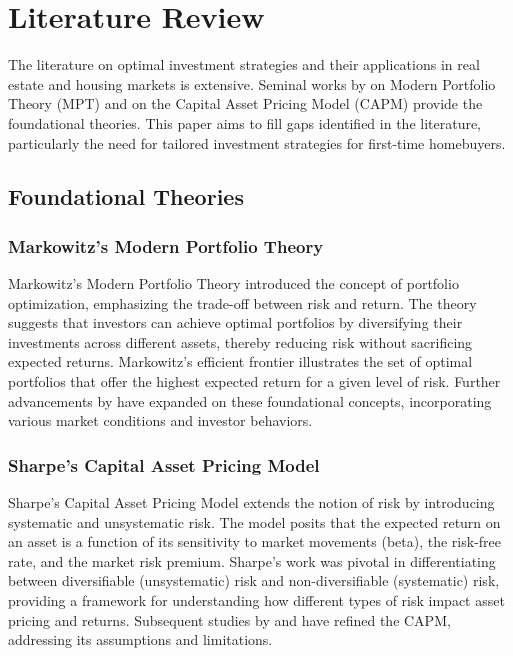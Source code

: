 \section{Literature Review}

The literature on optimal investment strategies and their applications in real estate and housing markets is extensive. Seminal works by \citet{markowitz1952portfolio} on Modern Portfolio Theory (MPT) and \citet{sharpe1964capital} on the Capital Asset Pricing Model (CAPM) provide the foundational theories. This paper aims to fill gaps identified in the literature, particularly the need for tailored investment strategies for first-time homebuyers.

\subsection{Foundational Theories}

\subsubsection{Markowitz's Modern Portfolio Theory}
Markowitz's Modern Portfolio Theory \citep{markowitz1952portfolio} introduced the concept of portfolio optimization, emphasizing the trade-off between risk and return. The theory suggests that investors can achieve optimal portfolios by diversifying their investments across different assets, thereby reducing risk without sacrificing expected returns. Markowitz's efficient frontier illustrates the set of optimal portfolios that offer the highest expected return for a given level of risk. Further advancements by \citet{fabozzi2002foundations} have expanded on these foundational concepts, incorporating various market conditions and investor behaviors.

\subsubsection{Sharpe's Capital Asset Pricing Model}
Sharpe's Capital Asset Pricing Model \citep{sharpe1964capital} extends the notion of risk by introducing systematic and unsystematic risk. The model posits that the expected return on an asset is a function of its sensitivity to market movements (beta), the risk-free rate, and the market risk premium. Sharpe's work was pivotal in differentiating between diversifiable (unsystematic) risk and non-diversifiable (systematic) risk, providing a framework for understanding how different types of risk impact asset pricing and returns. Subsequent studies by \citet{fama1973risk} and \citet{black1972capital} have refined the CAPM, addressing its assumptions and limitations.

